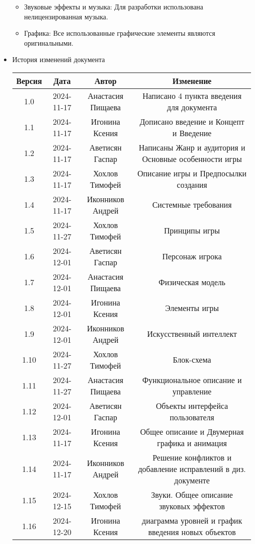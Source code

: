 \documentclass{article}
\begin{document}
\begin{itemize}
\begin{itemize}
\item Звуковые эффекты и музыка: Для разработки использована нелицензированная музыка.

\item Графика: Все использованные графические элементы являются оригинальными.
\end{itemize}

\item История изменений документа
\begin{center}
\begin{tabular}{| c | c | c | c |}
\hline
 Версия & Дата & Автор & Изменение \\  \hline
 1.0 & 2024-11-17 & Анастасия Пищаева & Написано 4 пункта введения для документа\\ \hline
 1.1 & 2024-11-17 & Игонина Ксения & Дописано введение и Концепт и Введение\\  \hline 
 1.2 & 2024-11-17 & Аветисян Гаспар & Написаны Жанр и аудитория и Основные особенности игры\\  \hline
 1.3 & 2024-11-17 & Хохлов Тимофей & Описание игры и Предпосылки создания\\  \hline
 1.4 & 2024-11-17 & Иконников Андрей & Системные требования\\ \hline 
 1.5 & 2024-11-27 & Хохлов Тимофей & Принципы игры\\  \hline
 1.6 & 2024-12-01 & Аветисян Гаспар & Персонаж игрока\\ \hline
 1.7 & 2024-12-01 & Анастасия Пищаева & Физическая модель\\ \hline
 1.8 & 2024-12-01 & Игонина Ксения & Элементы игры\\ \hline
 1.9 & 2024-12-01 & Иконников Андрей & Искусственный интеллект\\ \hline
 1.10 & 2024-11-27 & Хохлов Тимофей & Блок-схема\\  \hline
 1.11 & 2024-11-27 & Анастасия Пищаева & Функциональное описание и управление\\  \hline
 1.12 & 2024-12-01 & Аветисян Гаспар & Объекты интерфейса пользователя\\ \hline
 1.13 & 2024-11-17 & Игонина Ксения & Общее описание и Двумерная графика и анимация\\  \hline
 1.14 & 2024-11-17 & Иконников Андрей & Решение конфликтов и добавление исправлений в диз. документе\\  \hline
 1.15 & 2024-12-15 & Хохлов Тимофей & Звуки. Общее описание звуковых эффектов\\  \hline
 1.16 & 2024-12-20 & Игонина Ксения & диаграмма уровней и график введения новых объектов\\ \hline



\end{tabular}
\end{center}
\end{itemize}
\end{document}
